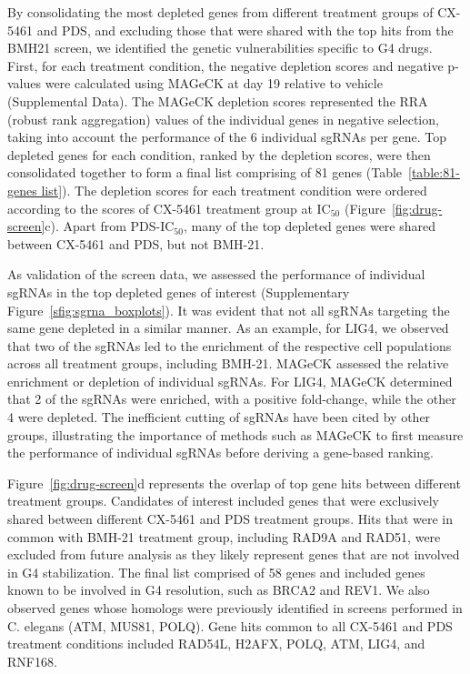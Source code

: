 By consolidating the most depleted genes from different treatment groups of CX-5461 and PDS, and excluding those that were shared with the top hits from the BMH21 screen, we identified the genetic vulnerabilities specific to G4 drugs. First, for each treatment condition, the negative depletion scores and negative p-values were calculated using MAGeCK at day 19 relative to vehicle (Supplemental Data). The MAGeCK depletion scores represented the RRA (robust rank aggregation) values of the individual genes in negative selection, taking into account the performance of the 6 individual sgRNAs per gene. Top depleted genes for each condition, ranked by the depletion scores, were then consolidated together to form a final list comprising of 81 genes (Table~\ref{table:81-genes list}). The depletion scores for each treatment condition were ordered according to the scores of CX-5461 treatment group at IC$_{50}$ (Figure~\ref{fig:drug-screen}c). Apart from PDS-IC$_{50}$, many of the top depleted genes were shared between CX-5461 and PDS, but not BMH-21. 

As validation of the screen data, we assessed the performance of individual sgRNAs in the top depleted genes of interest (Supplementary Figure~\ref{sfig:sgrna_boxplots}). It was evident that not all sgRNAs targeting the same gene depleted in a similar manner. As an example, for LIG4, we observed that two of the sgRNAs led to the enrichment of the respective cell populations across all treatment groups, including BMH-21. MAGeCK assessed the relative enrichment or depletion of individual sgRNAs. For LIG4, MAGeCK determined that 2 of the sgRNAs were enriched, with a positive fold-change, while the other 4 were depleted. The inefficient cutting of sgRNAs have been cited by other groups\cite{Doench2014,Doench2018}, illustrating the importance of methods such as MAGeCK to first measure the performance of individual sgRNAs before deriving a gene-based ranking.

Figure~\ref{fig:drug-screen}d represents the overlap of top gene hits between different treatment groups. 
Candidates of interest included genes that were exclusively shared between different CX-5461 and PDS treatment groups. 
Hits that were in common with BMH-21 treatment group, including RAD9A and RAD51, were excluded from future analysis as they likely represent genes that are not involved in G4 stabilization. 
The final list comprised of 58 genes and included genes known to be involved in G4 resolution, such as BRCA2 and REV1. 
We also observed genes whose homologs were previously identified in screens performed in C. elegans (ATM, MUS81, POLQ)\cite{Xu2017}. Gene hits common to all CX-5461 and PDS treatment conditions included RAD54L, H2AFX, POLQ, ATM, LIG4, and RNF168.


